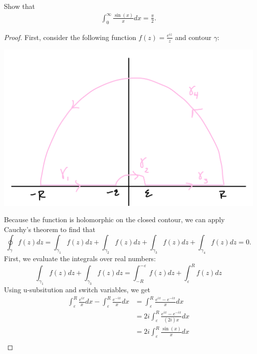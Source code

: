 \documentclass[12pt]{article}
\newenvironment{statement}[2][Statement]{\begin{trivlist}
\item[\hskip \labelsep {\bfseries #1}\hskip \labelsep {\bfseries #2.}]}{\end{trivlist}}
\begin{document}
\begin{statement}[Problem]{2}
  Show that 
  \begin{align*}
    \int^{\infty}_0 \frac{\sin(x)}{x} dx=\frac{\pi}{2}.
  \end{align*}
\end{statement}
\begin{proof}
  First, consider the following function $f(z)=\frac{e^{iz}}{z}$ and contour $\gamma$:
    \begin{center} \includegraphics[scale=.2]{2-1.png} \end{center}
  Because the function is holomorphic on the closed contour, we can apply Cauchy's theorem to find that 
  \begin{equation*}
    \oint_{\gamma} f(z)dz = \int_{\gamma_1} f(z)dz + \int_{\gamma_2} f(z)dz + \int_{\gamma_3} f(z)dz +\int_{\gamma_4} f(z)dz = 0.
  \end{equation*}
  First, we evaluate the integrals over real numbers:
  \begin{equation*}
    \int_{\gamma_1} f(z)dz + \int_{\gamma_3} f(z)dz = \int_{-R}^{-\varepsilon} f(z)dz + \int_{\varepsilon}^{R} f(z)dz
  \end{equation*}
  Using u-subsitution and switch variables, we get 
  \begin{align*}
    \int^R_{\varepsilon} \frac{e^{ix}}{x}dx - \int^R_{\varepsilon} \frac{e^{-ix}}{x}dx &= \int^R_{\varepsilon} \frac{e^{ix}-e^{-ix}}{x}dx \\
                                                                                       &= 2i \int^R_{\varepsilon} \frac{e^{ix}-e^{-ix}}{(2i)x}dx \\
                                                                                       &= 2i \int^R_{\varepsilon} \frac{\sin (x)}{x}dx \\

\end{align*}
\end{proof}
\end{document}
